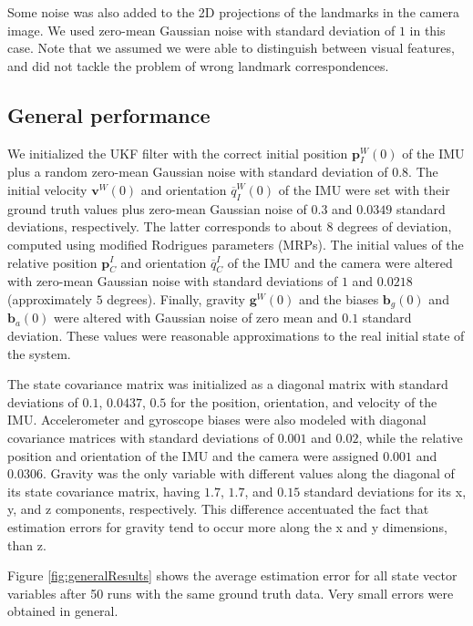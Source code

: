 \documentclass[letterpaper]{article}
\newcommand{\bb}[1]{\mathbf{#1}}
\begin{document}
Some noise was also added to the 2D projections of the landmarks in
the camera image. We used zero-mean Gaussian noise with
standard deviation of $1$ in this case. Note that we assumed we were able to
distinguish between visual features, and did not tackle the problem of
wrong landmark correspondences.

\subsection{General performance}

We initialized the UKF filter with the correct initial position
$\bb{p}_I^W(0)$ of the IMU plus a random zero-mean Gaussian noise with
standard deviation of $0.8$. The initial velocity $\bb{v}^W(0)$ and
orientation $\overline{q}_I^W(0)$ of the IMU were set with their
  ground truth values plus zero-mean Gaussian noise of $0.3$ and
  $0.0349$ standard deviations, respectively. The latter corresponds
  to about $8$ degrees of deviation, computed using modified Rodrigues
  parameters (MRPs). The initial values of the relative position
  $\bb{p}_C^I$ and orientation $\overline{q}_C^I$ of the IMU and the
  camera were altered with zero-mean Gaussian noise with standard
  deviations of $1$ and $0.0218$ (approximately $5$ degrees). Finally,
  gravity $\bb{g}^W(0)$ and the biases $\bb{b}_g(0)$ and $\bb{b}_a(0)$
  were altered with Gaussian noise of zero mean and $0.1$ standard
  deviation. These values were reasonable approximations to the real
  initial state of the system.

The state covariance matrix was initialized as a diagonal matrix with
standard deviations of $0.1$, $0.0437$, $0.5$ for the position,
orientation, and velocity of the IMU. Accelerometer and gyroscope
biases were also modeled with diagonal covariance matrices with
standard deviations of $0.001$ and $0.02$, while the relative position
and orientation of the IMU and the camera were assigned $0.001$ and
$0.0306$. Gravity was the only variable with different values along
the diagonal of its state covariance matrix, having $1.7$, $1.7$, and
$0.15$ standard deviations for its x, y, and z components,
respectively. This difference accentuated the fact that estimation
errors for gravity tend to occur more along the x and y dimensions, than z.

Figure \ref{fig:generalResults} shows the average estimation error for
all state vector variables after 50 runs with the same ground truth
data. Very small errors were obtained in general.
\end{document}
